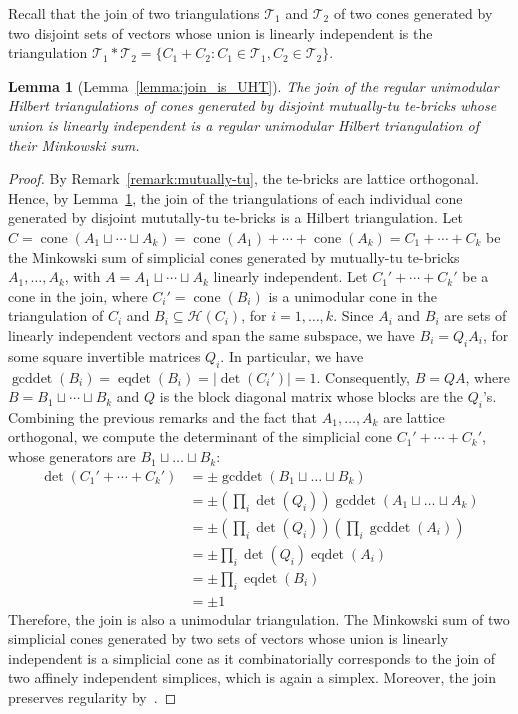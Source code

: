 \documentclass[11pt,a4paper]{amsart}
\theoremstyle{plain}
\newtheorem{lemma}[theorem]{Lemma}
\theoremstyle{definition}
\newcommand{\cal}[1]{\mathcal{#1}}
\DeclareMathOperator{\cone}{cone}
\DeclareMathOperator{\eqdet}{eqdet}
\DeclareMathOperator{\gcddet}{gcddet}
\renewcommand{\cal}[1]{\mathcal{#1}}
\begin{document}
Recall that the join of two triangulations $\cal T_1$ and $\cal T_2$ of two cones generated by two disjoint sets of vectors whose union is linearly independent is the triangulation $\cal T_1 * \cal T_2 = \{C_1+C_2\colon C_1\in \cal T_1,C_2\in \cal T_2\}$.
\begin{lemma}[Lemma~\ref{lemma:join_is_UHT}]\label{lemma:joint_is_UHT_full}
The join of the regular unimodular Hilbert triangulations of cones generated by disjoint mutually-tu te-bricks whose union is linearly independent is a regular unimodular Hilbert triangulation of their Minkowski sum.
\end{lemma} 
\begin{proof}
By Remark~\ref{remark:mutually-tu}, the te-bricks are lattice orthogonal.
Hence, by Lemma~\ref{lemma:joint_is_UHT_full}, the join of the triangulations of each individual cone generated by disjoint mututally-tu te-bricks is a Hilbert triangulation.
Let $C = \cone(A_1\sqcup \cdots\sqcup A_k) = \cone(A_1)+\cdots+\cone(A_k) = C_1+\cdots+C_k$ be the Minkowski sum of simplicial cones generated by mutually-tu te-bricks $A_1,\ldots,A_k$, with $A=A_1\sqcup\cdots \sqcup A_k$ linearly independent. 
Let $C_1'+\cdots+C_k'$ be a cone in the join, where $C_i'=\cone(B_i)$ is a unimodular cone in the triangulation of $C_i$ and $B_i\subseteq \cal H(C_i)$, for $i=1,\dots,k$.
Since $A_i$ and $B_i$ are sets of linearly independent vectors and span the same subspace, we have $B_i=  Q_i A_i$, for some square invertible matrices $Q_i$.
In particular, we have $\gcddet(B_i)=\eqdet(B_i)=|\det(C_i')|=1$.
Consequently, $B=QA$, where $B=B_1\sqcup\cdots\sqcup B_k$ and $Q$ is the block diagonal matrix whose blocks are the $Q_i$'s.
Combining the previous remarks and the fact that $A_1,\ldots,A_k$ are lattice orthogonal, we compute the determinant of the simplicial cone $C_1'+\cdots+C_k'$, whose generators are $B_1\sqcup \dots\sqcup B_k$:
\begin{align*}
\det(C_1'+\cdots+C_k')
&= \pm\gcddet(B_1\sqcup \dots\sqcup B_k)\\
&= \pm\left(\prod_i \det(Q_i)\right)\gcddet(A_1\sqcup \dots \sqcup A_k)\\
&=\pm \left(\prod_i \det(Q_i)\right)\left(\prod_i\gcddet(A_i)\right)\\
&=\pm \prod_i \det(Q_i)\eqdet(A_i)\\
&=\pm \prod_i \eqdet(B_i)\\
&=\pm 1
\end{align*}
Therefore, the join is also a unimodular triangulation.
The Minkowski sum of two simplicial cones generated by two sets of vectors whose union is linearly independent is a simplicial cone as it combinatorially corresponds to the join of two affinely independent simplices, which is again a simplex. Moreover, the join preserves regularity by~\cite[Section~2.3.2]{Haase_Paffenholz_Piechnik_Santos_2021}.
\end{proof}
\end{document}
